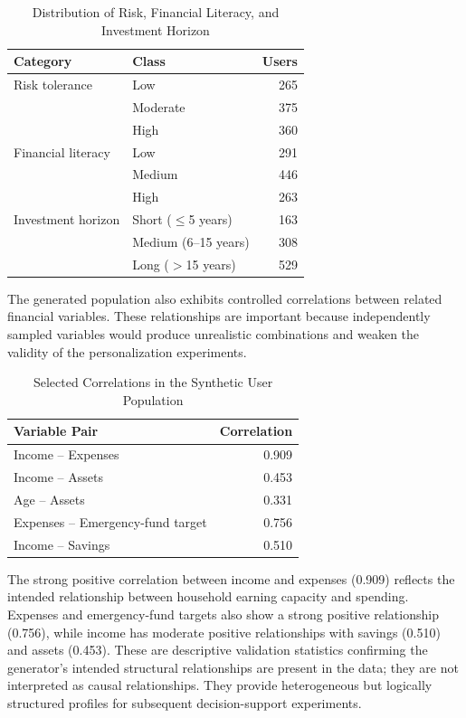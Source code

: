 \documentclass[12pt,a4paper]{article}
\begin{document}
\begin{table}[H]
\centering
\caption{Distribution of Risk, Financial Literacy, and Investment Horizon}
\label{tab:usercategories}
\small
\begin{tabular}{llr}
\toprule
\textbf{Category} & \textbf{Class} & \textbf{Users} \\
\midrule
Risk tolerance & Low & 265 \\
 & Moderate & 375 \\
 & High & 360 \\
\midrule
Financial literacy & Low & 291 \\
 & Medium & 446 \\
 & High & 263 \\
\midrule
Investment horizon & Short ($\leq$5 years) & 163 \\
 & Medium (6--15 years) & 308 \\
 & Long ($>$15 years) & 529 \\
\bottomrule
\end{tabular}
\end{table}

The generated population also exhibits controlled correlations between related financial variables. These relationships are important because independently sampled variables would produce unrealistic combinations and weaken the validity of the personalization experiments.

\begin{table}[H]
\centering
\caption{Selected Correlations in the Synthetic User Population}
\label{tab:usercorrelations}
\small
\begin{tabular}{lr}
\toprule
\textbf{Variable Pair} & \textbf{Correlation} \\
\midrule
Income -- Expenses & 0.909 \\
Income -- Assets & 0.453 \\
Age -- Assets & 0.331 \\
Expenses -- Emergency-fund target & 0.756 \\
Income -- Savings & 0.510 \\
\bottomrule
\end{tabular}
\end{table}

The strong positive correlation between income and expenses (0.909) reflects the intended relationship between household earning capacity and spending. Expenses and emergency-fund targets also show a strong positive relationship (0.756), while income has moderate positive relationships with savings (0.510) and assets (0.453). These are descriptive validation statistics confirming the generator's intended structural relationships are present in the data; they are not interpreted as causal relationships. They provide heterogeneous but logically structured profiles for subsequent decision-support experiments.
\end{document}
